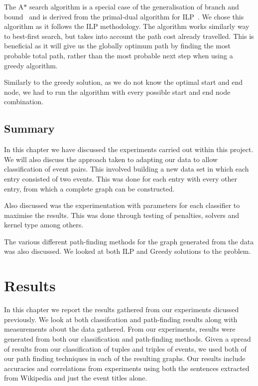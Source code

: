 \documentclass[bsc,frontabs,twoside,singlespacing,parskip,deptreport]{infthesis}     %
\begin{document}
The A$*$ search algorithm is a special case of the generalisation of branch and bound~\cite{balas1983branch} and is derived from the primal-dual algorithm for ILP~\cite{ye2012note}.
We chose this algorithm as it follows the ILP methodology. The algorithm works similarly way to best-first search, but takes into account the path cost already travelled.
This is beneficial as it will give us the globally optimum path by finding the most probable total path, rather than the most probable next step when using a
greedy algorithm.

Similarly to the greedy solution, as we do not know the optimal start and end node, we had to run the algorithm with every possible start and end node combination.


\section{Summary}
In this chapter we have discussed the experiments carried out within this project.
We will also discuss the approach taken to adapting our data to allow classification of event pairs. This involved building a new data set
in which each entry consisted of two events. This was done for each entry with every other entry, from which a complete
graph can be constructed.

Also discussed was the experimentation with parameters for each classifier to maximise the results. This was done through
testing of penalties, solvers and kernel type among others.

The various different path-finding methods for the graph generated from the data was also discussed.
We looked at both ILP and Greedy solutions to the problem.

\chapter{Results}
In this chapter we report the results gathered from our experiments dicussed previously.
We look at both classifcation and path-finding results along with measurements about the data gathered.
From our experiments, results were generated from both our classification and path-finding methods.
Given a spread of results from our classification of tuples and triples of events, we used both of our path finding
techniques in each of the resulting graphs. Our results include accuracies and correlations from
experiments using both the sentences extracted from Wikipedia and just the event titles alone.   
\end{document}
